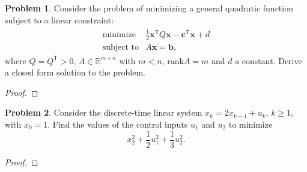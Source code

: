 \documentclass[12pt]{article}
\theoremstyle{definition}
\newtheorem{problem}{Problem}
\newcommand{\vc}[1]{\boldsymbol{#1}}
\newcommand{\tran}{\mathsf{T}}
\begin{document}
\newpage


\begin{problem}
  Consider the problem of minimizing a general quadratic function subject to a linear constraint:
  \begin{align*}
    \begin{array}{rl}
      \text{minimize} & \frac{1}{2} \vc{x}^\tran Q \vc{x} - \vc{c}^\tran \vc{x} + d\\
      \text{subject to} & A\vc{x} = \vc{b},
    \end{array}
  \end{align*}
  where $Q=Q^\tran > 0$, $A \in\mathbb{R}^{m \times n}$ with $m<n$, $\text{rank} A = m$ and $d$ a constant.
  Derive a closed form solution to the problem.
\end{problem}

\begin{proof}
\end{proof}
\newpage


\begin{problem}
  Consider the discrete-time linear system $x_k = 2 x_{k-1} + u_k$, $k \geq 1$, with
  $x_0 = 1$. Find the values of the control inputs $u_1$ and $u_2$ to minimize
  $$x_2^2 + \frac{1}{2}u_1^2+ \frac{1}{3}u_2^2.$$
\end{problem}

\begin{proof}
\end{proof}
\end{document}
